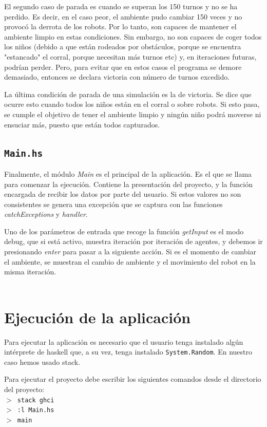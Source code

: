 \documentclass[twoside]{article}
\begin{document}
El segundo caso de parada es cuando se superan los 150 turnos y no se ha perdido. Es decir, en el caso peor, el ambiente pudo cambiar 150 veces y no provoc\'o la derrota de los robots. Por lo tanto, son capaces de mantener el ambiente limpio en estas condiciones. Sin embargo, no son capaces de coger todos los ni\~nos (debido a que est\'an rodeados por obst\'aculos, porque se encuentra "estancado" el corral, porque necesitan m\'as turnos etc) y, en iteraciones futuras, podr\'ian perder. Pero, para evitar que en estos casos el programa se demore demasiado, entonces se declara victoria con n\'umero de turnos excedido.

La \'ultima condici\'on de parada de una simulaci\'on es la de victoria. Se dice que ocurre esto cuando todos los ni\~nos est\'an en el corral o sobre robots. Si esto pasa, se cumple el objetivo de tener el ambiente limpio y ning\'un ni\~no podr\'a moverse ni ensuciar m\'as, puesto que est\'an todos capturados.

\subsection{\texttt{Main.hs}}
Finalmente, el m\'odulo \textit{Main} es el principal de la aplicaci\'on. Es el que se llama para comenzar la ejecuci\'on. Contiene la presentaci\'on del proyecto, y la funci\'on encargada de recibir los datos por parte del usuario. Si estos valores no son consistentes se genera una excepci\'on que se captura con las funciones \textit{catchExceptions} y \textit{handler}.

Uno de los par\'ametros de entrada que recoge la funci\'on \textit{getInput} es el modo debug, que si est\'a activo, muestra iteraci\'on por iteraci\'on de agentes, y debemos ir presionando \textit{enter} para pasar a la siguiente acci\'on. Si es el momento de cambiar el ambiente, se muestran el cambio de ambiente y el movimiento del robot en la misma iteraci\'on.\\\\


\section{Ejecuci\'on de la aplicaci\'on}
Para ejecutar la aplicaci\'on es necesario que el usuario tenga instalado alg\'un int\'erprete de haskell que, a su vez, tenga instalado \texttt{System.Random}. En nuestro caso hemos usado stack.

Para ejecutar el proyecto debe escribir los siguientes comandos desde el directorio del proyecto:\\[2cm]
\texttt{$>$ stack ghci}\\
\texttt{$>$ :l Main.hs}\\
\texttt{$>$ main}\\
\end{document}
